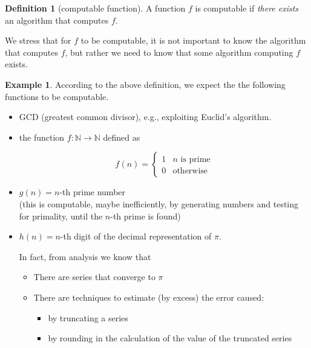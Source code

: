 \documentclass{amsbook}
\newcommand{\nat}{\ensuremath{\mathbb{N}}}
\theoremstyle{definition}
\newtheorem{definition}[theorem]{Definition}
\newtheorem{example}[theorem]{Example}
\theoremstyle{remark}
\numberwithin{section}{chapter}
\numberwithin{equation}{chapter}
\begin{document}
\begin{definition}[computable function]
  A function $f$ is computable if \emph{there exists} an algorithm
  that computes $f$.
\end{definition}

We stress that for $f$ to be computable, it is not important to know the algorithm that computes $f$, but rather we need to know that some algorithm computing $f$ exists. 

\begin{example}
  According to the above definition, we expect the the following
  functions to be computable.

  \begin{itemize}
    
  \item GCD (greatest common divisor), e.g., exploiting Euclid's
    algorithm.
    
  \item the function $f : \nat \to \nat$ defined as 

    \begin{equation*}
      f(n)=
      \begin{cases}
        1 & n \mbox{ is prime} \\
        0 &   \mbox{otherwise}
      \end{cases}
    \end{equation*}

  \item
    $g(n)= n$-th prime number\\
    (this is computable, maybe inefficiently, by generating numbers
    and testing for primality, until the $n$-th prime is found)

    
  \item 
    $h(n) = n$-th digit of the decimal representation of $\pi$.

    In fact, from analysis we know that
    \begin{itemize}
    \item There are series that converge to $\pi$
    \item There are techniques to estimate (by excess) the error caused:
      \begin{itemize}
      \item by truncating a series
      \item by rounding in the calculation of the value of the truncated series
      \end{itemize}
    \end{itemize}
  \end{itemize}
\end{example}
\end{document}
